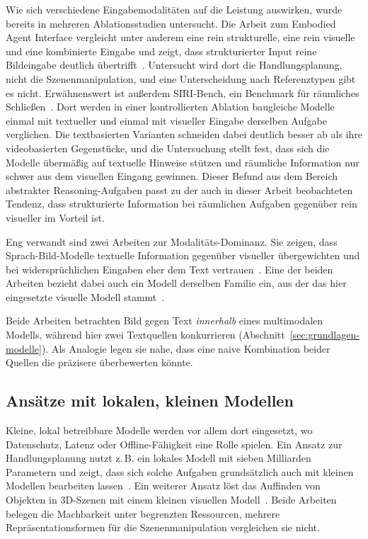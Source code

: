 Wie sich verschiedene Eingabemodalitäten auf die Leistung auswirken, wurde bereits in mehreren Ablationsstudien untersucht.
Die Arbeit zum Embodied Agent Interface vergleicht unter anderem eine rein strukturelle, eine rein visuelle und eine kombinierte Eingabe und zeigt, dass strukturierter Input reine Bildeingabe deutlich übertrifft~\cite{li2025a}.
Untersucht wird dort die Handlungsplanung, nicht die Szenenmanipulation, und eine Unterscheidung nach Referenztypen gibt es nicht.
Erwähnenswert ist außerdem SIRI-Bench, ein Benchmark für räumliches Schließen~\cite{song2026}.
Dort werden in einer kontrollierten Ablation baugleiche Modelle einmal mit textueller und einmal mit visueller Eingabe derselben Aufgabe verglichen.
Die textbasierten Varianten schneiden dabei deutlich besser ab als ihre videobasierten Gegenstücke, und die Untersuchung stellt fest, dass sich die Modelle übermäßig auf textuelle Hinweise stützen und räumliche Information nur schwer aus dem visuellen Eingang gewinnen.
Dieser Befund aus dem Bereich abstrakter Reasoning-Aufgaben passt zu der auch in dieser Arbeit beobachteten Tendenz, dass strukturierte Information bei räumlichen Aufgaben gegenüber rein visueller im Vorteil ist.

Eng verwandt sind zwei Arbeiten zur Modalitäts-Dominanz.
Sie zeigen, dass Sprach-Bild-Modelle textuelle Information gegenüber visueller übergewichten und bei widersprüchlichen Eingaben eher dem Text vertrauen~\cite{deng2025, wu2025}.
Eine der beiden Arbeiten bezieht dabei auch ein Modell derselben Familie ein, aus der das hier eingesetzte visuelle Modell stammt~\cite{wu2025}.

Beide Arbeiten betrachten Bild gegen Text \emph{innerhalb} eines multimodalen Modells, während hier zwei Textquellen konkurrieren (Abschnitt~\ref{sec:grundlagen-modelle}).
Als Analogie legen sie nahe, dass eine naive Kombination beider Quellen die präzisere überbewerten könnte.

\subsection{Ansätze mit lokalen, kleinen Modellen}

Kleine, lokal betreibbare Modelle werden vor allem dort eingesetzt, wo Datenschutz, Latenz oder Offline-Fähigkeit eine Rolle spielen.
Ein Ansatz zur Handlungsplanung nutzt z.\,B. ein lokales Modell mit sieben Milliarden Parametern und zeigt, dass sich solche Aufgaben grundsätzlich auch mit kleinen Modellen bearbeiten lassen~\cite{wu2023}.
Ein weiterer Ansatz löst das Auffinden von Objekten in 3D-Szenen mit einem kleinen visuellen Modell~\cite{dinh2026}.
Beide Arbeiten belegen die Machbarkeit unter begrenzten Ressourcen, mehrere Repräsentationsformen für die Szenenmanipulation vergleichen sie nicht.


